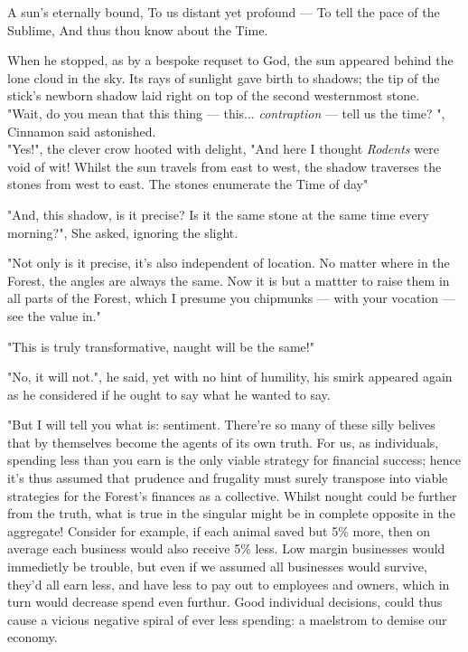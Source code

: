 	A sun's eternally bound,
	To us distant yet profound —
	To tell the pace of the Sublime,
	And thus thou know about the Time.



When he stopped, as by a bespoke requset to God, the sun appeared behind the lone cloud in the sky. Its rays of sunlight gave birth to shadows; the tip of the stick's newborn shadow laid right on top of the second westernmost stone.\\

"Wait, do you mean that this thing — this... \textit{contraption} — tell us the time? ", Cinnamon said astonished.\\

"Yes!", the clever crow hooted with delight, "And here I thought \textit{Rodents} were void of wit! Whilst the sun travels from east to west, the shadow traverses the stones from west to east. The stones enumerate the Time of day"

"And, this shadow, is it precise? Is it the same stone at the same time every morning?", She asked, ignoring the slight. %

"Not only is it precise, it's also independent of location. No matter where in the Forest, the angles are always the same. Now it is but a mattter to raise them in all parts of the Forest, which I presume you chipmunks — with your vocation — see the value in."

"This is truly transformative, naught will be the same!" 

"No, it will not.", he said, yet with no hint of humility, his smirk appeared again as he considered if he ought to say what he wanted to say.

"But I will tell you what is: sentiment. There're so many of these silly belives that by themselves become the agents of its own truth. For us, as individuals, spending less than you earn is the only viable strategy for financial success; hence it's thus assumed that prudence and frugality must surely transpose into viable strategies for the Forest's finances as a collective. Whilst nought could be further from the truth, what is true in the singular might be in complete opposite in the aggregate! Consider for example, if each animal saved but 5\% more, then on average each business would also receive 5\% less. Low margin businesses would immedietly be trouble, but even if we assumed all businesses would survive, they'd all earn less, and have less to pay out to employees and owners, which in turn would decrease spend even furthur. Good individual decisions, could thus cause a vicious negative spiral of ever less spending: a maelstrom to demise our economy. 
  
